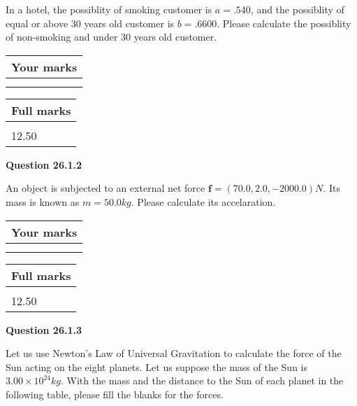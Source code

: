 \documentclass[12pt]{article}
\begin{document}
  
In a hotel, the possiblity of  %
smoking customer is
$a =  %
.540$, and the possiblity of  %
equal or above 30 years old customer is $ b =  %
.6600$.
Please calculate the possiblity of  %
 non-smoking and  %
under 30 years old customer.
 

 

 
\vspace{0.3in}
  
\vspace{0.2in}
  
         \begin{tabular}{|l|}
\hline
 Your marks  \\
\hline
 \\ 
 \\ 
\hline
\end{tabular}
\hspace{0.05in} \begin{tabular}{|l|}
\hline
 Full marks  \\
\hline
 \\ 
12.50 \\
\hline
\end{tabular}
{\textbf{\Large{Question
26.1.2 
}}}
  
  
 
An object is subjected to an external net force $\mathbf{f}=(
70.0,  %
2.0,
-2000.0  )N$. Its mass is known as
$m= %
50.0 kg$. Please calculate its accelaration.
 
 

 

 
\vspace{0.3in}
  
\vspace{0.2in}
  
         \begin{tabular}{|l|}
\hline
 Your marks  \\
\hline
 \\ 
 \\ 
\hline
\end{tabular}
\hspace{0.05in} \begin{tabular}{|l|}
\hline
 Full marks  \\
\hline
 \\ 
12.50 \\
\hline
\end{tabular}
{\textbf{\Large{Question
26.1.3 
}}}
  
  
Let us use Newton's Law of Universal Gravitation to calculate the force
of the Sun acting on the eight planets. Let us suppose the mass of the
Sun is $ %
3.00 \times 10^{24} kg$. With the mass and the
distance to the Sun of each planet in the following table, please fill
the blanks for the forces.
 
\end{document}
